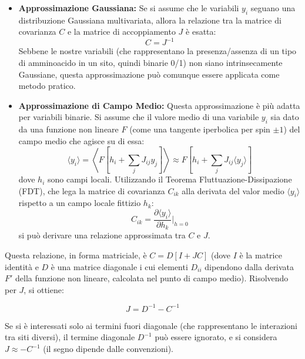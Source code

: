 \begin{itemize}
    \item \textbf{Approssimazione Gaussiana:} Se si assume che le variabili $y_i$ seguano una distribuzione Gaussiana multivariata, allora la relazione tra la matrice di covarianza $C$ e la matrice di accoppiamento $J$ è esatta:
    \begin{equation} \label{eq:ch25_5}
    C = J^{-1}
    \end{equation}
    Sebbene le nostre variabili (che rappresentano la presenza/assenza di un tipo di amminoacido in un sito, quindi binarie 0/1) non siano intrinsecamente Gaussiane, questa approssimazione può comunque essere applicata come metodo pratico.
    
    \item \textbf{Approssimazione di Campo Medio:} Questa approssimazione è più adatta per variabili binarie. Si assume che il valore medio di una variabile $y_i$ sia dato da una funzione non lineare $F$ (come una tangente iperbolica per spin $\pm 1$) del campo medio che agisce su di essa:
    \begin{equation} \label{eq:ch25_6}
    \langle y_i \rangle = \left\langle F\left[h_i + \sum_j J_{ij} y_j\right] \right\rangle \approx F\left[h_i + \sum_j J_{ij} \langle y_j \rangle\right]
    \end{equation}
    dove $h_i$ sono campi locali. Utilizzando il Teorema Fluttuazione-Dissipazione (FDT), che lega la matrice di covarianza $C_{ik}$ alla derivata del valor medio $\langle y_i \rangle$ rispetto a un campo locale fittizio $h_k$:
    \begin{equation} \label{eq:ch25_7}
    C_{ik} = \frac{\partial \langle y_i \rangle }{ \partial h_k}\bigg|_{h=0}
    \end{equation}
    si può derivare una relazione approssimata tra $C$ e $J$.
\end{itemize}

Questa relazione, in forma matriciale, è $C = D[I+JC]$ (dove $I$ è la matrice identità e $D$ è una matrice diagonale i cui elementi $D_{ii}$ dipendono dalla derivata $F'$ della funzione non lineare, calcolata nel punto di campo medio). Risolvendo per $J$, si ottiene:

\begin{equation} \label{eq:ch25_8}
J = D^{-1} - C^{-1}
\end{equation}

Se si è interessati solo ai termini fuori diagonale (che rappresentano le interazioni tra siti diversi), il termine diagonale $D^{-1}$ può essere ignorato, e si considera $J \approx -C^{-1}$ (il segno dipende dalle convenzioni).

